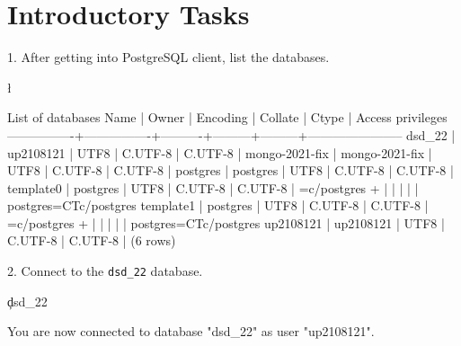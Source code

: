 
\section*{Introductory Tasks}
1. After getting into PostgreSQL client, list the databases.
\begin{sql}
\l
\end{sql}
\begin{pseudo*}
    List of databases
    Name      |     Owner      | Encoding | Collate |  Ctype  |   Access privileges
----------------+----------------+----------+---------+---------+-----------------------
dsd_22         | up2108121      | UTF8     | C.UTF-8 | C.UTF-8 |
mongo-2021-fix | mongo-2021-fix | UTF8     | C.UTF-8 | C.UTF-8 |
postgres       | postgres       | UTF8     | C.UTF-8 | C.UTF-8 |
template0      | postgres       | UTF8     | C.UTF-8 | C.UTF-8 | =c/postgres          +
              |                |          |         |         | postgres=CTc/postgres
template1      | postgres       | UTF8     | C.UTF-8 | C.UTF-8 | =c/postgres          +
              |                |          |         |         | postgres=CTc/postgres
up2108121      | up2108121      | UTF8     | C.UTF-8 | C.UTF-8 |
(6 rows)
\end{pseudo*}

2. Connect to the \verb|dsd_22| database.
\begin{sql}
\c dsd_22
\end{sql}
\begin{pseudo*}
You are now connected to database "dsd_22" as user "up2108121".
\end{pseudo*}

